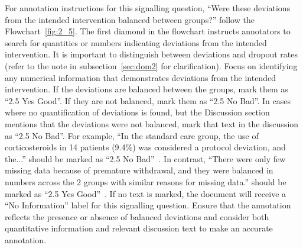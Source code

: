 \documentclass[sn-mathphys,Numbered]{sn-jnl}%
\begin{document}
For annotation instructions for this signalling question, ``Were these deviations from the intended intervention balanced between groups?'' follow the Flowchart~\ref{fig:2_5}.
The first diamond in the flowchart instructs annotators to search for quantities or numbers indicating deviations from the intended intervention.
It is important to distinguish between deviations and dropout rates (refer to the note in subsection~\ref{sec:dom2} for clarification).
Focus on identifying any numerical information that demonstrates deviations from the intended intervention.
If the deviations are balanced between the groups, mark them as ``2.5 Yes Good''.
If they are not balanced, mark them as ``2.5 No Bad''.
In cases where no quantification of deviations is found, but the Discussion section mentions that the deviations were not balanced, mark that text in the discussion as ``2.5 No Bad''.
For example, ``In the standard care group, the use of corticosteroids in 14 patients (9.4\%) was considered a protocol deviation, and the...'' should be marked as ``2.5 No Bad''~\cite{tomazini2020effect}.
In contrast, ``There were only few missing data because of premature withdrawal, and they were balanced in numbers across the 2 groups with similar reasons for missing data.'' should be marked as ``2.5 Yes Good''~\cite{prodeus2016fermented}.
If no text is marked, the document will receive a ``No Information'' label for this signalling question.
Ensure that the annotation reflects the presence or absence of balanced deviations and consider both quantitative information and relevant discussion text to make an accurate annotation.
%
%
%
\end{document}
